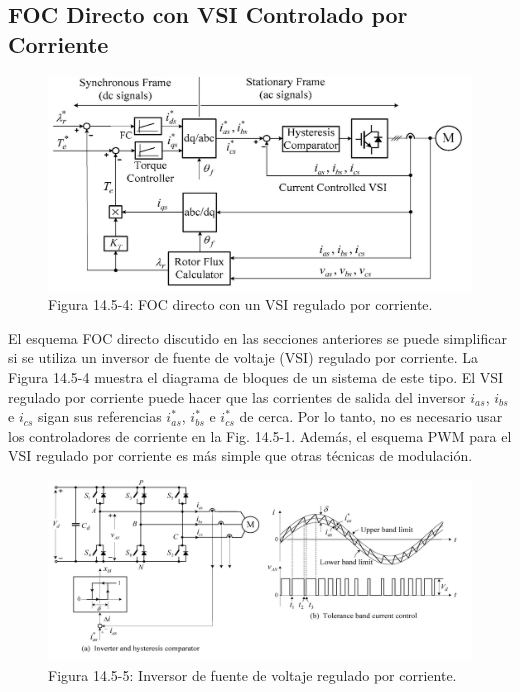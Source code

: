 \documentclass[letterpaper,12pt]{article}
\begin{document}
\clearpage
\subsection{FOC Directo con VSI Controlado por Corriente}

\begin{figure}[ht]
\centering
\includegraphics[scale=0.9]{graficos/img16.jpg}
\caption{Figura 14.5-4: FOC directo con un VSI regulado por corriente.}
\end{figure}
\FloatBarrier

El esquema FOC directo discutido en las secciones anteriores se puede simplificar si se utiliza un inversor de fuente de voltaje (VSI) regulado por corriente. La Figura 14.5-4 muestra el diagrama de bloques de un sistema de este tipo. El VSI regulado por corriente puede hacer que las corrientes de salida del inversor $i_{as}$, $i_{bs}$ e $i_{cs}$ sigan sus referencias $i_{as}^*$, $i_{bs}^*$ e $i_{cs}^*$ de cerca. Por lo tanto, no es necesario usar los controladores de corriente en la Fig. 14.5-1. Además, el esquema PWM para el VSI regulado por corriente es más simple que otras técnicas de modulación.

\begin{figure}[ht]
\centering
\includegraphics[scale=0.8]{graficos/img17.jpg}
\caption{Figura 14.5-5: Inversor de fuente de voltaje regulado por corriente.}
\end{figure}
\FloatBarrier
\end{document}
